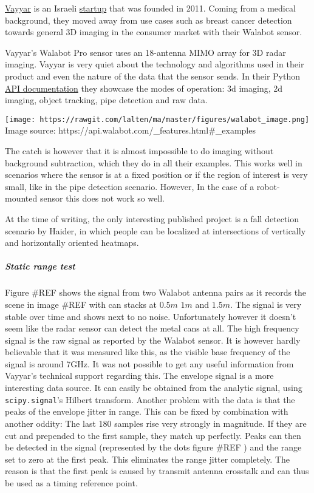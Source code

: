 \href{https://www.vayyar.com/}{Vayyar} is an Israeli
\href{https://www.crunchbase.com/organization/vayyar}{startup} that was
founded in 2011. Coming from a medical background, they moved away from
use cases such as breast cancer detection towards general 3D imaging in
the consumer market with their Walabot sensor.

Vayyar's Walabot Pro sensor uses an 18-antenna MIMO array for 3D radar
imaging. Vayyar is very quiet about the technology and algorithms used
in their product and even the nature of the data that the sensor sends.
In their Python \href{https://api.walabot.com}{API documentation} they
showcase the modes of operation: 3d imaging, 2d imaging, object
tracking, pipe detection and raw data.

\texttt{[image: https://rawgit.com/lalten/ma/master/figures/walabot\_image.png]}
Image source: https://api.walabot.com/\_features.html\#\_examples

The catch is however that it is almost impossible to do imaging without
background subtraction, which they do in all their examples. This works
well in scenarios where the sensor is at a fixed position or if the
region of interest is very small, like in the pipe detection scenario.
However, In the case of a robot-mounted sensor this does not work so
well.

At the time of writing, the only interesting published project is a fall
detection scenario \cite{Haider2017} by Haider, in which people can be
localized at intersections of vertically and horizontally oriented
heatmaps.

\subparagraph{Static range test}\label{static-range-test}

Figure \#REF shows the signal from two Walabot antenna pairs as it
records the scene in image \#REF with can stacks at \(0.5m\) \(1m\) and
\(1.5m\). The signal is very stable over time and shows next to no
noise. Unfortunately however it doesn't seem like the radar sensor can
detect the metal cans at all. The high frequency signal is the raw
signal as reported by the Walabot sensor. It is however hardly
believable that it was measured like this, as the visible base frequency
of the signal is around 7GHz. It was not possible to get any useful
information from Vayyar's technical support regarding this. The envelope
signal is a more interesting data source. It can easily be obtained from
the analytic signal, using \texttt{scipy.signal}'s Hilbert transform.
Another problem with the data is that the peaks of the envelope jitter
in range. This can be fixed by combination with another oddity: The last
180 samples rise very strongly in magnitude. If they are cut and
prepended to the first sample, they match up perfectly. Peaks can then
be detected in the signal (represented by the dots figure \#REF ) and
the range set to zero at the first peak. This eliminates the range
jitter completely. The reason is that the first peak is caused by
transmit antenna crosstalk and can thus be used as a timing reference
point.

